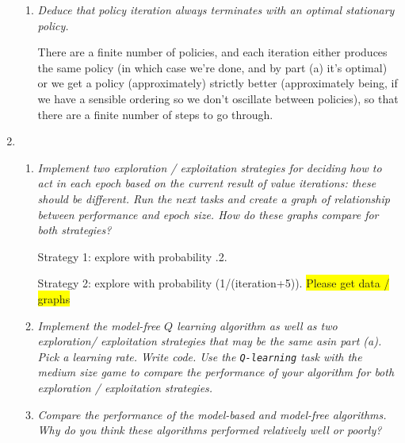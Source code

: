 \documentclass{article}
\newcommand{\edit}[1]{\colorbox{Yellow}{#1}}
\begin{document}
\begin{enumerate}
\begin{enumerate}
  \item \emph{Deduce that policy iteration always terminates with an
    optimal stationary policy.}
    
    There are a finite number of policies, and each iteration either
    produces the same policy (in which case we're done, and by part
    (a) it's optimal) or we get a policy (approximately) strictly
    better (approximately being, if we have a sensible ordering so we
    don't oscillate between policies), so that there are a finite
    number of steps to go through.
  \end{enumerate}

\item 
  \begin{enumerate}
  \item \emph{Implement two exploration / exploitation strategies for
    deciding how to act in each epoch based on the current result of
    value iterations: these should be different.  Run the next tasks
    and create a graph of relationship between performance and epoch
    size. How do these graphs compare for both strategies?}

    Strategy 1: explore with probability .2.

    Strategy 2: explore with probability (1/(iteration+5)).
    \edit{Please get data / graphs}

  \item \emph{Implement the model-free $Q$ learning algorithm as well
    as two exploration/ exploitation strategies that may be the same
    asin part (a). Pick a learning rate. Write code. Use the
    \texttt{Q-learning} task with the medium size game to compare the
    performance of your algorithm for both exploration / exploitation
    strategies.}

  \item \emph{Compare the performance of the model-based and
    model-free algorithms. Why do you think these algorithms performed
    relatively well or poorly?}

  \end{enumerate}

\end{enumerate}
\end{document}
